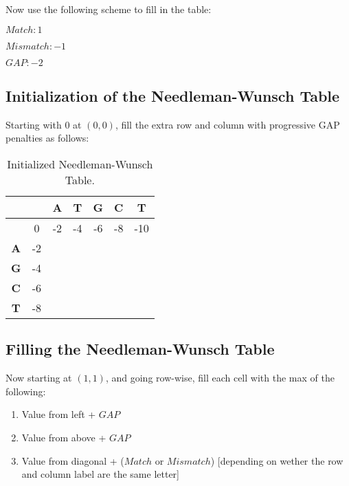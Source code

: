 Now use the following scheme to fill in the table:

$Match: 1$

$Mismatch: -1$

$GAP: -2$

\subsection{Initialization of the Needleman-Wunsch Table}

Starting with 0 at $(0,0)$, fill the extra row and column with progressive GAP penalties as follows:

\begin{table}[htbp]
    \centering
    \begin{tabular}{|c|c|c|c|c|c|c|}
        \hline
          & $\phantom{\textbf{A}}$ & \textbf{A} & \textbf{T} & \textbf{G} & \textbf{C} & \textbf{T} \\
        \hline
        $\phantom{\textbf{A}}$& 0 & -2 & -4 & -6 & -8 & -10 \\
        \hline
        \textbf{A} & -2 &  &  &  &  &  \\
        \hline
        \textbf{G} & -4 &  &  &  &  &  \\
        \hline
        \textbf{C} & -6 &  &  &  &  &  \\
        \hline
        \textbf{T} & -8 &  &  &  &  &  \\
        \hline
    \end{tabular}
    \caption{Initialized Needleman-Wunsch Table.}
\end{table}

\subsection{Filling the Needleman-Wunsch Table}

Now starting at $(1,1)$, and going row-wise, fill each cell with the max of the following:

\begin{enumerate}
    \item Value from left + $GAP$
    
    \item Value from above + $GAP$
    
    \item Value from diagonal + ($Match$ or $Mismatch$) [depending on wether the row and column label are the same letter]

\end{enumerate}

